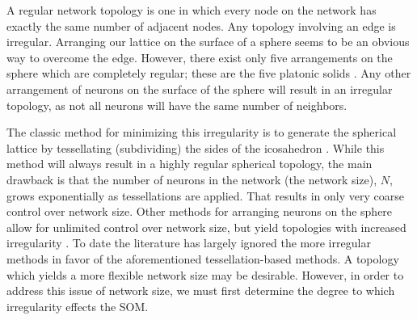 A regular network topology is one in which every node on the network has exactly the
same number of adjacent nodes.  Any topology involving an edge is irregular.
Arranging our lattice on the surface of a sphere seems to be an obvious
way to overcome the edge.  However, there exist only five arrangements on the
sphere which are completely regular; these are the five platonic solids \citep{ritter99,
harris2000}.  Any other arrangement of neurons on the surface of the sphere will
result in an irregular topology, as not all neurons will have the same number of
neighbors.

The classic method for minimizing this irregularity is to generate
the spherical lattice by tessellating (subdividing) the sides of the icosahedron
\citep{Nishio:2006fk}.  While this method will always result in a highly
regular spherical topology, the main drawback is that the number of neurons in
the network (the network size), \(N\), grows exponentially as tessellations are
applied. That results in only very coarse control over network size.
 Other methods for arranging neurons on the sphere allow
for unlimited control over network size, but yield topologies with increased
irregularity \citep{harris2000, wu2005, Nishio:2006fk}.  To date the
literature has largely ignored the more irregular methods in favor of the
aforementioned tessellation-based methods.  A topology which yields a more flexible network
size may be desirable.  However, in order to address this issue of network
size, we must first determine the degree to which irregularity effects the
SOM.


